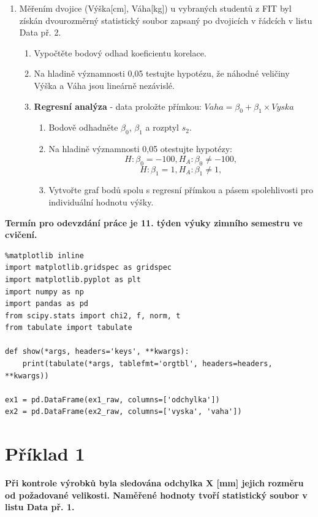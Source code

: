 \documentclass[11pt,titlepage]{article}
\begin{document}
\begin{enumerate}
\item Měřením dvojice (Výška[cm], Váha[kg]) u vybraných studentů z FIT byl získán
dvourozměrný statistický soubor zapsaný po dvojicích v řádcích v listu
Data př. 2.

\begin{enumerate}
\item Vypočtěte bodový odhad koeficientu korelace.
\item Na hladině významnosti 0,05 testujte hypotézu, že náhodné veličiny Výška a
Váha jsou lineárně nezávislé.
\item \textbf{Regresní analýza} - data proložte přímkou: \(Vaha = \beta_0 + \beta_1 \times Vyska\)
\begin{enumerate}
\item Bodově odhadněte \(\beta_0\), \(\beta_1\) a rozptyl \(s_2\).
\item Na hladině významnosti 0,05 otestujte hypotézy:
\[H : \beta_0 = -100, H_A : \beta_0 \neq -100,\]
\[H : \beta_1 = 1, H_A : \beta_1 \neq 1,\]
\item Vytvořte graf bodů spolu s regresní přímkou a pásem spolehlivosti pro
individuální hodnotu výšky.
\end{enumerate}
\end{enumerate}
\end{enumerate}

\textbf{Termín pro odevzdání práce je 11. týden výuky zimního semestru ve cvičení.}

\newpage

\begin{listing}[htbp]
\begin{verbatim}
%matplotlib inline
import matplotlib.gridspec as gridspec
import matplotlib.pyplot as plt
import numpy as np
import pandas as pd
from scipy.stats import chi2, f, norm, t
from tabulate import tabulate

def show(*args, headers='keys', **kwargs):
    print(tabulate(*args, tablefmt='orgtbl', headers=headers, **kwargs))

ex1 = pd.DataFrame(ex1_raw, columns=['odchylka'])
ex2 = pd.DataFrame(ex2_raw, columns=['vyska', 'vaha'])
\end{verbatim}
\end{listing}

\section{Příklad 1}
\label{sec:org03d4000}
\textbf{Při kontrole výrobků byla sledována odchylka X [mm] jejich rozměru od požadované velikosti.
Naměřené hodnoty tvoří statistický soubor v listu Data př. 1.}
\end{document}
